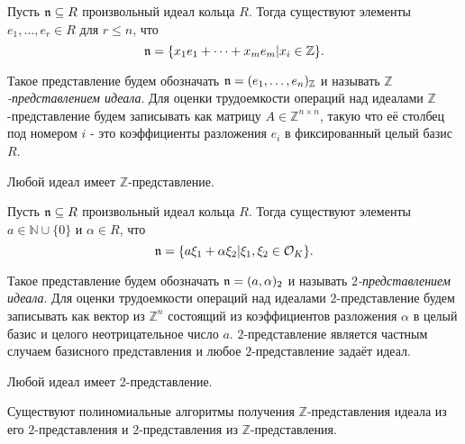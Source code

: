\documentclass[_00_dissertation.tex]{subfiles}
\begin{document}
\begin{definition}
    Пусть $\mathfrak{n} \subseteq R$ произвольный идеал кольца $R$.
    Тогда существуют элементы $e_1, \dots, e_r \in R$ для $r \leq n$, что
    \begin{equation*}
        \mathfrak{n} = \{x_1 e_1 + \dots + x_m e_m | x_i \in \mathbb{Z}\}.
    \end{equation*}

    Такое представление будем обозначать $\mathfrak{n} = (e_1, \dots, e_n)_{\mathbb{Z}}$ и называть \emph{$\mathbb{Z}$-представлением идеала}.
    Для оценки трудоемкости операций над идеалами $\mathbb{Z}$-представление будем записывать как матрицу $A \in \mathbb{\mathbb{Z}}^{n \times n}$, такую что её столбец под номером $i$ - это коэффициенты разложения $e_i$ в фиксированный целый базис $R$.
\end{definition}

\begin{statement} \cite[с.~64]{source:Pohst}
    Любой идеал имеет $\mathbb{Z}$-представление.
\end{statement}

\begin{definition}
    Пусть $\mathfrak{n} \subseteq R$ произвольный идеал кольца $R$.
    Тогда существуют элементы $a \in \mathbb{N} \cup \{0\}$ и $\alpha \in R$, что 
    \begin{equation*}
        \mathfrak{n} = \{a \xi_1 + \alpha \xi_2 | \xi_1, \xi_2 \in \mathcal{O}_K\}.
    \end{equation*}

    Такое представление будем обозначать $\mathfrak{n} = (a, \alpha)_2$ и называть \emph{$2$-представлением идеала}.
    Для оценки трудоемкости операций над идеалами $2$-представление будем записывать как вектор из $\mathbb{Z}^n$ состоящий из коэффициентов разложения $\alpha$ в целый базис и целого неотрицательное число $a$.
    $2$-представление является частным случаем базисного представления и любое $2$-представление задаёт идеал.
\end{definition}

\begin{statement} \cite[с.~64]{source:Pohst}
    Любой идеал имеет 2-представление.
\end{statement}

\begin{statement} \cite[с.~64]{source:Pohst}
    Существуют полиномиальные алгоритмы получения $\mathbb{Z}$-представления идеала из его $2$-представления и $2$-представления из $\mathbb{Z}$-представления.
\end{statement}
\end{document}
